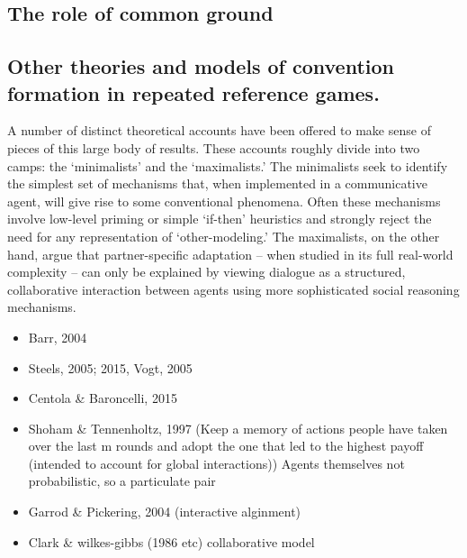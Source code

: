 \documentclass[11pt, floatsintext, man]{apa6}
\begin{document}
\subsection{The role of common ground}

\subsection{Other theories and models of convention formation in repeated reference games.}

A number of distinct theoretical accounts have been offered to make sense of pieces of this large body of results. These accounts roughly divide into two camps: the `minimalists' and the `maximalists.' The minimalists seek to identify the simplest set of mechanisms that, when implemented in a communicative agent, will give rise to some conventional phenomena. Often these mechanisms involve low-level priming or simple `if-then' heuristics and strongly reject the need for any representation of `other-modeling.' The maximalists, on the other hand, argue that partner-specific adaptation -- when studied in its full real-world complexity -- can only be explained by viewing dialogue as a structured, collaborative interaction between agents using more sophisticated social reasoning mechanisms. 

\begin{itemize}
\item Barr, 2004
\item Steels, 2005; 2015, Vogt, 2005
\item Centola \& Baroncelli, 2015
\item Shoham \& Tennenholtz, 1997 (Keep a memory of actions people have taken over the last m rounds and adopt the one that led to the highest payoff (intended to account for global interactions))
Agents themselves not probabilistic, so a particulate pair 
\item Garrod \& Pickering, 2004 (interactive alginment) 
\item Clark \& wilkes-gibbs (1986 etc) collaborative model
\end{itemize}

\end{document}
